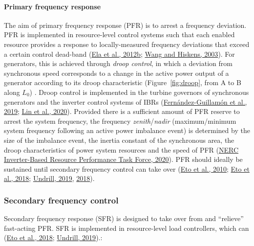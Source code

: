 \documentclass[12pt,a4paper,]{report}
\begin{document}
\hypertarget{primary-frequency-response}{%
\paragraph{Primary frequency
response}\label{primary-frequency-response}}

The aim of primary frequency response (PFR) is to arrest a frequency
deviation. PFR is implemented in resource-level control systems such
that each enabled resource provides a response to locally-measured
frequency deviations that exceed a certain control dead-band
(\protect\hyperlink{ref-elaAlternativeApproachesIncentivizing2012}{Ela
et al., 2012b};
\protect\hyperlink{ref-wangReviewAGCImplementation2003}{Wang and
Hiskens, 2003}). For generators, this is achieved through \emph{droop
control}, in which a deviation from synchronous speed corresponds to a
change in the active power output of a generator according to its droop
characteristic (Figure~\ref{fig:droop}, from A to B along \(L_0\)) .
Droop control is implemented in the turbine governors of synchronous
generators and the inverter control systems of IBRs
(\protect\hyperlink{ref-fernandez-guillamonPowerSystemsHigh2019}{Fernández-Guillamón
et al., 2019};
\protect\hyperlink{ref-linResearchRoadmapGridForming2020}{Lin et al.,
2020}). Provided there is a sufficient amount of PFR reserve to arrest
the system frequency, the frequency \emph{zenith}/\emph{nadir}
(maximum/minimum system frequency following an active power imbalance
event) is determined by the size of the imbalance event, the inertia
constant of the synchronous area, the droop characteristics of power
system resources and the speed of PFR
(\protect\hyperlink{ref-nercinverter-basedresourceperformancetaskforceFastFrequencyResponse2020}{NERC
Inverter-Based Resource Performance Task Force, 2020}). PFR should
ideally be sustained until secondary frequency control can take over
(\protect\hyperlink{ref-etoUseFrequencyResponse2010}{Eto et al., 2010};
\protect\hyperlink{ref-etoFrequencyControlRequirements2018}{Eto et al.,
2018}; \protect\hyperlink{ref-undrillNotesFrequencyControl2019}{Undrill,
2019},
\protect\hyperlink{ref-undrillPrimaryFrequencyResponse2018}{2018}).

\hypertarget{secondary-frequency-control}{%
\subsubsection{Secondary frequency
control}\label{secondary-frequency-control}}

Secondary frequency response (SFR) is designed to take over from and
``relieve'' fast-acting PFR. SFR is implemented in resource-level load
controllers, which can
(\protect\hyperlink{ref-etoFrequencyControlRequirements2018}{Eto et al.,
2018}; \protect\hyperlink{ref-undrillNotesFrequencyControl2019}{Undrill,
2019}).:
\end{document}
